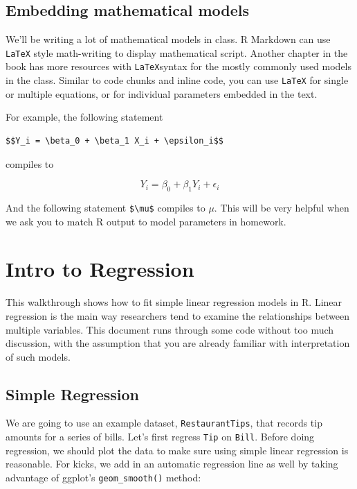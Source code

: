 \documentclass[
  letterpaper,
  DIV=11,
  numbers=noendperiod]{scrreprt}
\begin{document}
\hypertarget{embedding-mathematical-models}{%
\section{Embedding mathematical
models}\label{embedding-mathematical-models}}

We'll be writing a lot of mathematical models in class. R Markdown can
use \texttt{LaTeX} style math-writing to display mathematical script.
Another chapter in the book has more resources with \texttt{LaTeX}syntax
for the mostly commonly used models in the class. Similar to code chunks
and inline code, you can use \texttt{LaTeX} for single or multiple
equations, or for individual parameters embedded in the text.

For example, the following statement

\begin{verbatim}
$$Y_i = \beta_0 + \beta_1 X_i + \epsilon_i$$
\end{verbatim}

compiles to

\[Y_i = \beta_0 + \beta_1 Y_i + \epsilon_i\]

And the following statement \texttt{\$\textbackslash{}mu\$} compiles to
\(\mu\). This will be very helpful when we ask you to match R output to
model parameters in homework.

\hypertarget{intro-to-regression}{%
\chapter{Intro to Regression}\label{intro-to-regression}}

This walkthrough shows how to fit simple linear regression models in R.
Linear regression is the main way researchers tend to examine the
relationships between multiple variables. This document runs through
some code without too much discussion, with the assumption that you are
already familiar with interpretation of such models.

\hypertarget{simple-regression}{%
\section{Simple Regression}\label{simple-regression}}

We are going to use an example dataset, \texttt{RestaurantTips}, that
records tip amounts for a series of bills. Let's first regress
\texttt{Tip} on \texttt{Bill}. Before doing regression, we should plot
the data to make sure using simple linear regression is reasonable. For
kicks, we add in an automatic regression line as well by taking
advantage of ggplot's \texttt{geom\_smooth()} method:
\end{document}
